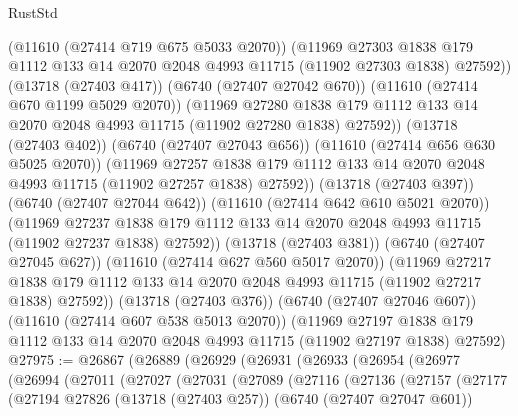 \begin{lexlean}{RustStd}
\begin{coremodule}
              (@11610 (@27414 @719 @675 @5033 @2070))
              (@11969
                @27303
                @1838
                @179
                @1112
                @133
                @14
                @2070
                @2048
                @4993
                @11715
                (@11902 @27303 @1838)
                @27592))
            (@13718 (@27403 @417))
            (@6740 (@27407 @27042 @670))
            (@11610 (@27414 @670 @1199 @5029 @2070))
            (@11969
              @27280
              @1838
              @179
              @1112
              @133
              @14
              @2070
              @2048
              @4993
              @11715
              (@11902 @27280 @1838)
              @27592))
          (@13718 (@27403 @402))
          (@6740 (@27407 @27043 @656))
          (@11610 (@27414 @656 @630 @5025 @2070))
          (@11969
            @27257
            @1838
            @179
            @1112
            @133
            @14
            @2070
            @2048
            @4993
            @11715
            (@11902 @27257 @1838)
            @27592))
        (@13718 (@27403 @397))
        (@6740 (@27407 @27044 @642))
        (@11610 (@27414 @642 @610 @5021 @2070))
        (@11969
          @27237
          @1838
          @179
          @1112
          @133
          @14
          @2070
          @2048
          @4993
          @11715
          (@11902 @27237 @1838)
          @27592))
      (@13718 (@27403 @381))
      (@6740 (@27407 @27045 @627))
      (@11610 (@27414 @627 @560 @5017 @2070))
      (@11969
        @27217
        @1838
        @179
        @1112
        @133
        @14
        @2070
        @2048
        @4993
        @11715
        (@11902 @27217 @1838)
        @27592))
    (@13718 (@27403 @376))
    (@6740 (@27407 @27046 @607))
    (@11610 (@27414 @607 @538 @5013 @2070))
    (@11969 @27197 @1838 @179 @1112 @133 @14 @2070 @2048 @4993 @11715 (@11902 @27197 @1838) @27592)
@27975 := @26867
    (@26889
      (@26929
        (@26931
          (@26933
            (@26954
              (@26977
                (@26994
                  (@27011
                    (@27027
                      (@27031
                        (@27089
                          (@27116
                            (@27136
                              (@27157
                                (@27177
                                  (@27194
                                    @27826
                                    (@13718 (@27403 @257))
                                    (@6740 (@27407 @27047 @601))

\end{coremodule}
\end{lexlean}
